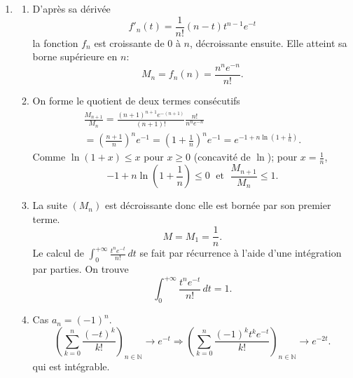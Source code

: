 \begin{enumerate}
\item \begin{enumerate}
\item D'après sa dérivée
\begin{displaymath}
 f'_{n}(t)=\frac{1}{n!}(n-t)t^{n-1}e^{-t}
\end{displaymath}
la fonction $f_{n}$ est croissante de 0 à $n$, décroissante ensuite.
Elle atteint sa borne supérieure en $n$:
\begin{displaymath}
M_{n}=f_{n}(n)=\frac{n^{n}e^{-n}}{n!}.
\end{displaymath}

\item On forme le quotient de deux termes consécutifs
\begin{multline*}
\frac{M_{n+1}}{M_{n}}
  = \frac{(n+1)^{n+1}e^{-(n+1)}}{(n+1)!}\frac{n!}{n^{n}e^{-n}} \\
  = \left(\frac{n+1}{n}\right)^{n}e^{-1}
  = \left(1+\frac{1}{n}\right)^{n}e^{-1}=e^{-1+n\ln (1+\frac{1}{n})}.
\end{multline*}
Comme $\ln (1+x)\leq x$ pour $x\geq 0$ (concavité de $\ln$); pour $x=\frac{1}{n}$,
\begin{displaymath}
 -1+n\ln (1+\frac{1}{n})\leq 0\; \text{ et } \; \frac{M_{n+1}}{M_{n}}\leq 1.
\end{displaymath}

\item La suite $(M_n)$ est décroissante donc elle est bornée par son premier terme.
\begin{displaymath}
   M = M_{1} = \frac{1}{n}.
\end{displaymath}
Le calcul de $\int_{0}^{+\infty}\frac{t^{n}e^{-t}}{n!}\,dt$ se fait par récurrence à l'aide d'une intégration par parties. On trouve
\begin{displaymath}
  \int_{0}^{+\infty}\frac{t^{n}e^{-t}}{n!}\,dt = 1.
\end{displaymath}

\item Cas $a_{n}=(-1)^{n}$.
\begin{displaymath}
  \left(\sum _{k=0}^{n}\frac{(-t)^{k}}{k!}\right)_{n\in \mathbb{N}}\rightarrow e^{-t}  \Rightarrow
  \left(\sum _{k=0}^{n}\frac{(-1)^{k}t^{k}e^{-t}}{k!}\right)_{n\in \mathbb{N}}\rightarrow e^{-2t}.
\end{displaymath}
qui est intégrable.


\end{enumerate}
\end{enumerate}
